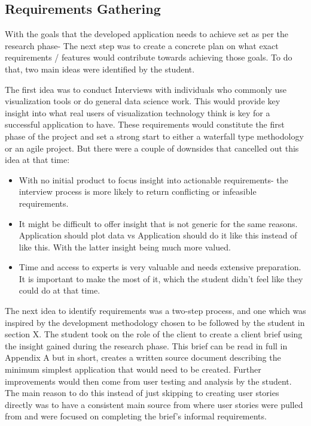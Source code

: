 \subsection{Requirements Gathering}
With the goals that the developed application needs to achieve set as per the research phase- The next step was to create a concrete plan on what exact requirements / features would contribute towards achieving those goals. To do that, two main ideas were identified by the student.

The first idea was to conduct Interviews with individuals who commonly use visualization tools or do general data science work. This would provide key insight into what real users of visualization technology think is key for a successful application to have. These requirements would constitute the first phase of the project and set a strong start to either a waterfall type methodology or an agile project.
But there were a couple of downsides that cancelled out this idea at that time:
\begin{itemize}
    \item With no initial product to focus insight into actionable requirements- the interview process is more likely to return conflicting or infeasible requirements.
    \item It might be difficult to offer insight that is not generic for the same reasons. Application should plot data vs Application should do it like this instead of like this. With the latter insight being much more valued.
    \item Time and access to experts is very valuable and needs extensive preparation. It is important to make the most of it, which the student didn’t feel like they could do at that time.
\end{itemize}

The next idea to identify requirements was a two-step process, and one which was inspired by the development methodology chosen to be followed by the student in section X. The student took on the role of the client to create a client brief using the insight gained during the research phase. This brief can be read in full in Appendix A but in short, creates a written source document describing the minimum simplest application that would need to be created. Further improvements would then come from user testing and analysis by the student. The main reason to do this instead of just skipping to creating user stories directly was to have a consistent main source from where user stories were pulled from and were focused on completing the brief's informal requirements.

